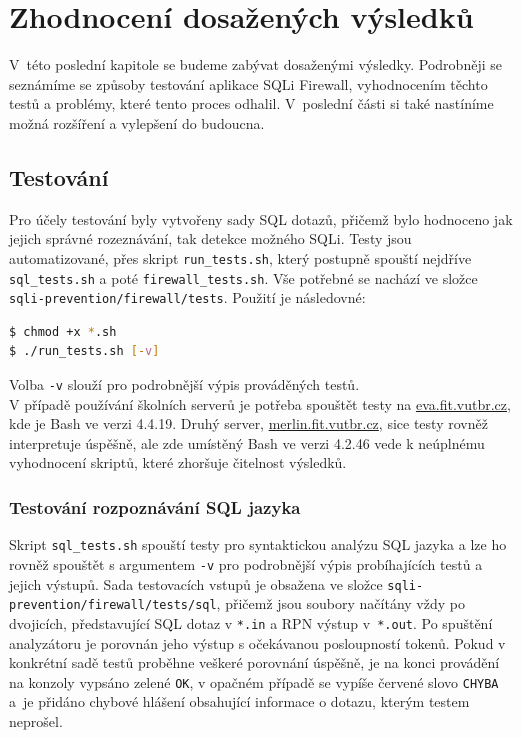 \chapter{Zhodnocení dosažených výsledků} \label{ch:vysledky}
V~této poslední kapitole se budeme zabývat dosaženými výsledky. Podrobněji se seznámíme se způsoby testování aplikace SQLi Firewall, vyhodnocením těchto
testů a problémy, které  tento proces odhalil. V~poslední části si také nastíníme možná rozšíření a vylepšení do budoucna.

\section{Testování} \label{sec:7:testovani}
Pro účely testování byly vytvořeny sady SQL dotazů, přičemž bylo hodnoceno jak jejich správné rozeznávání, tak detekce možného SQLi.
Testy jsou automatizované, přes skript \texttt{run\_tests.sh}, který postupně spouští nejdříve \texttt{sql\_tests.sh}
a poté \texttt{firewall\_tests.sh}. Vše potřebné se nachází ve složce \texttt{sqli-prevention/firewall/tests}.
Použití je následovné:

\begin{lstlisting}[language=bash]
$ chmod +x *.sh
$ ./run_tests.sh [-v]
\end{lstlisting}

Volba \texttt{-v} slouží pro podrobnější výpis prováděných testů. \\

V případě používání školních serverů je potřeba spouštět testy na \url{eva.fit.vutbr.cz}, kde je Bash ve verzi 4.4.19.
Druhý server, \url{merlin.fit.vutbr.cz}, sice testy rovněž interpretuje úspěšně, ale zde umístěný Bash ve verzi 4.2.46 vede k neúplnému vyhodnocení 
skriptů, které zhoršuje čitelnost výsledků.

\subsection{Testování rozpoznávání SQL jazyka}
Skript \texttt{sql\_tests.sh} spouští testy pro syntaktickou analýzu SQL jazyka a lze ho rovněž spouštět s argumentem \texttt{-v}
pro podrobnější výpis probíhajících testů a jejich výstupů. Sada testovacích vstupů je obsažena ve složce \texttt{sqli-prevention/firewall/tests/sql},
přičemž jsou soubory načítány vždy po dvojicích, představující SQL dotaz v \texttt{*.in} a RPN výstup v~\texttt{*.out}. Po spuštění analyzátoru je
porovnán jeho výstup s očekávanou posloupností tokenů. Pokud v konkrétní sadě testů proběhne veškeré porovnání úspěšně, je na konci provádění na
konzoly vypsáno zelené \texttt{OK}, v opačném případě se vypíše červené slovo \texttt{CHYBA} a~je přidáno chybové hlášení obsahující informace o 
dotazu, kterým testem neprošel. \\

